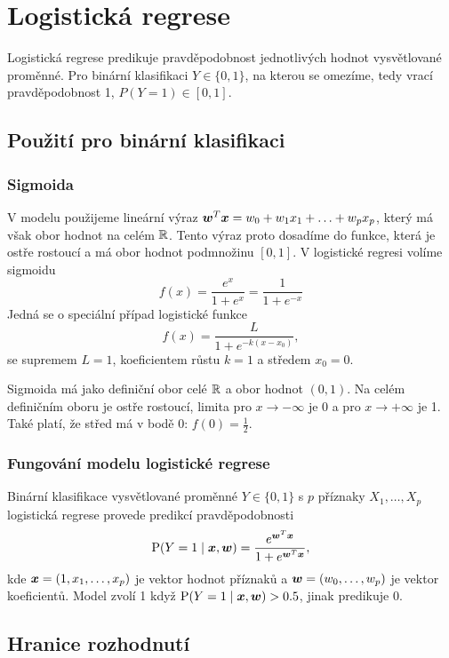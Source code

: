 \section{Logistická regrese}

Logistická regrese predikuje pravděpodobnost jednotlivých hodnot vysvětlované proměnné. Pro binární klasifikaci $Y \in \{0, 1\}$, na kterou se omezíme, tedy vrací pravděpodobnost 1, $P(Y = 1) \in [0, 1]$.

\subsection{Použití pro binární klasifikaci}

\subsubsection{Sigmoida}

V modelu použijeme lineární výraz $\bm{w}^T\bm{x} = w_0 + w_1 x_1 + \ldots + w_p x_p$, který má však obor hodnot na celém $\mathbb{R}$. Tento výraz proto dosadíme do funkce, která je ostře rostoucí a má obor hodnot podmnožinu $[0, 1]$. V logistické regresi volíme sigmoidu
\[f(x) = \frac{e^x}{1+e^x} = \frac{1}{1+e^{-x}}\]
Jedná se o speciální případ logistické funkce
\[f(x) = \frac{L}{1 + e^{-k(x-x_0)}},\]
se supremem $L=1$, koeficientem růstu $k=1$ a středem $x_0 = 0$.

Sigmoida má jako definiční obor celé $\mathbb{R}$ a obor hodnot $(0, 1)$. Na celém definičním oboru je ostře rostoucí, limita pro $x \rightarrow -\infty$ je 0 a pro $x \rightarrow +\infty$ je 1. Také platí, že střed má v bodě 0: $f(0) = \frac{1}{2}$.

\subsubsection{Fungování modelu logistické regrese}

Binární klasifikace vysvětlované proměnné $Y \in \{0,1\}$ s $p$ příznaky $X_1, \ldots, X_p$ logistická regrese provede predikcí pravděpodobnosti
\begin{equation*}
    \text{P} (Y=1 \mid \bm{x}, \bm{w} ) = \frac{e^{\bm{w}^T\bm{x}}}{1 + e^{\bm{w}^T\bm{x}}},
\end{equation*}
kde $\bm{x} = (1, x_1, \ldots, x_p)$ je vektor hodnot příznaků a $\bm{w} = (w_0, \ldots, w_p)$ je vektor koeficientů. Model zvolí 1 když $\text{P} (Y=1 \mid \bm{x}, \bm{w} ) > 0.5$, jinak predikuje 0.

\subsection{Hranice rozhodnutí}

